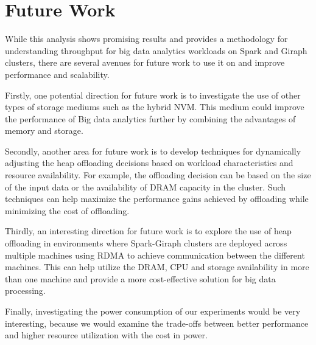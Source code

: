 \section{Future Work}

While this analysis shows promising results and provides a methodology for understanding
throughput for big data analytics workloads on Spark and Giraph
clusters, there are several avenues for future work to use it on and
improve performance and scalability. 

Firstly, one potential direction for future work is to investigate the
use of other types of storage mediums such as the hybrid NVM. This
medium could improve the performance of Big data analytics further by
combining the advantages of memory and storage.

Secondly, another area for future work is to develop techniques for
dynamically adjusting the heap offloading decisions based on workload
characteristics and resource availability. For example, the offloading
decision can be based on the size of the input data or the
availability of DRAM capacity in the cluster. Such techniques can help
maximize the performance gains achieved by offloading while minimizing
the cost of offloading.

Thirdly, an interesting direction for future work is to explore the
use of heap offloading in environments where Spark-Giraph clusters are
deployed across multiple machines using RDMA to achieve communication
between the different machines. This can help utilize the DRAM, CPU
and storage availability in more than one machine and provide a more
cost-effective solution for big data processing.

Finally, investigating the power consumption of our experiments would be 
very interesting, because we would examine the trade-offs between 
better performance and higher resource utilization with the cost in power.

